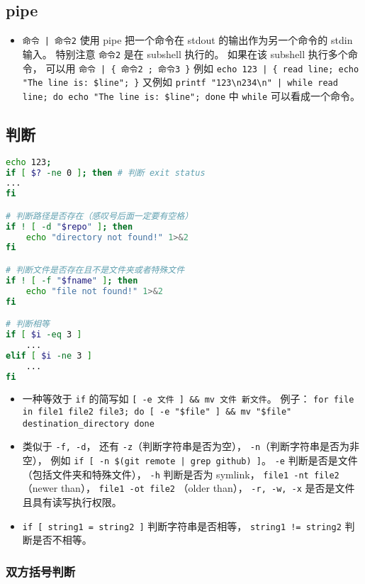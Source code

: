 \subsection{pipe}
\begin{itemize}
\item \verb`命令 | 命令2` 使用 pipe 把一个命令在 stdout 的输出作为另一个命令的 stdin 输入。 特别注意 \verb`命令2` 是在 subshell 执行的。 如果在该 subshell 执行多个命令， 可以用 \verb`命令 | { 命令2 ; 命令3 }` 例如 \verb`echo 123 | { read line; echo "The line is: $line"; }` 又例如 \verb`printf "123\n234\n" | while read line; do echo "The line is: $line"; done` 中 \verb`while` 可以看成一个命令。
\end{itemize}


\subsection{判断}
\begin{lstlisting}[language=bash]
echo 123;
if [ $? -ne 0 ]; then # 判断 exit status
...
fi

# 判断路径是否存在（感叹号后面一定要有空格）
if ! [ -d "$repo" ]; then
    echo "directory not found!" 1>&2
fi

# 判断文件是否存在且不是文件夹或者特殊文件
if ! [ -f "$fname" ]; then
    echo "file not found!" 1>&2
fi

# 判断相等
if [ $i -eq 3 ]
    ...
elif [ $i -ne 3 ]
    ...
fi
\end{lstlisting}
\begin{itemize}
\item 一种等效于 \verb`if` 的简写如 \verb`[ -e 文件 ] && mv 文件 新文件`。 例子： \verb`for file in file1 file2 file3; do [ -e "$file" ] && mv "$file" destination_directory done`
\item 类似于 \verb`-f, -d`， 还有 \verb`-z`（判断字符串是否为空）， \verb`-n`（判断字符串是否为非空）， 例如 \verb`if [ -n $(git remote | grep github) ]`。  \verb`-e` 判断是否是文件（包括文件夹和特殊文件）， \verb`-h` 判断是否为 symlink， \verb`file1 -nt file2` （newer than）， \verb`file1 -ot file2` （older than）， \verb`-r, -w, -x` 是否是文件且具有读写执行权限。
\item \verb`if [ string1 = string2 ]` 判断字符串是否相等， \verb`string1 != string2` 判断是否不相等。
\end{itemize}

\subsubsection{双方括号判断}


